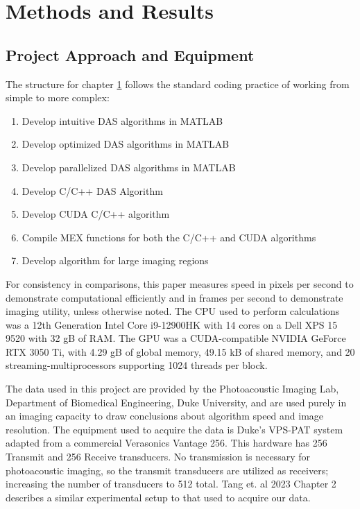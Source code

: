 \chapter{Methods and Results}
\label{Methodology}
\graphicspath{{C:/Users/cason/OneDrive/Documents/PSU/Project/02_MATLAB/05_DataOut/}}

\lstset{language=Matlab, style=Matlab-editor}

\section{Project Approach and Equipment}
\label{chapter3:approach}

    The structure for chapter \ref{Methodology} follows the standard coding practice of working from simple to more complex:
    \begin{enumerate}
        \item Develop intuitive DAS algorithms in MATLAB
        \item Develop optimized DAS algorithms in MATLAB
        \item Develop parallelized DAS algorithms in MATLAB
        \item Develop C/C++ DAS Algorithm
        \item Develop CUDA C/C++ algorithm
        \item Compile MEX functions for both the C/C++ and CUDA algorithms
        \item Develop algorithm for large imaging regions
    \end{enumerate}

    For consistency in comparisons, this paper measures speed in pixels per second to demonstrate computational efficiently and in frames per second to demonstrate imaging utility, unless otherwise noted. The CPU used to perform calculations was a 12th Generation Intel Core i9-12900HK with 14 cores on a Dell XPS 15 9520 with 32 gB of RAM. The GPU was a CUDA-compatible NVIDIA GeForce RTX 3050 Ti, with 4.29 gB of global memory, 49.15 kB of shared memory, and 20 streaming-multiprocessors supporting 1024 threads per block.

    The data used in this project are provided by the Photoacoustic Imaging Lab, Department of Biomedical Engineering, Duke University, and are used purely in an imaging capacity to draw conclusions about algorithm speed and image resolution. The equipment used to acquire the data is Duke's VPS-PAT system adapted from a commercial Verasonics Vantage 256. This hardware \cite{pmgroupVantageSystems2015} has 256 Transmit and 256 Receive transducers. No transmission is necessary for photoacoustic imaging, so the transmit transducers are utilized as receivers; increasing the number of transducers to 512 total. Tang et. al 2023 Chapter 2 \cite{tangHighfidelityDeepFunctional2023a} describes a similar experimental setup to that used to acquire our data.

